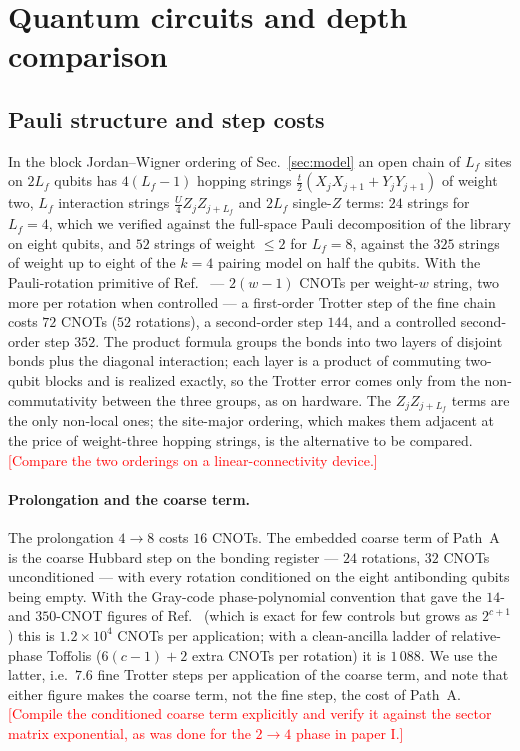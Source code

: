 \documentclass[
  aps,
  prc,
  reprint,
  superscriptaddress,
  floatfix,
  nofootinbib
]{revtex4-2}
\newcommand{\todo}[1]{\textcolor{red}{[#1]}}
\begin{document}
\section{Quantum circuits and depth comparison}
\label{sec:circuits}

\subsection{Pauli structure and step costs}
In the block Jordan--Wigner ordering of Sec.~\ref{sec:model} an open chain
of $L_f$ sites on $2L_f$ qubits has $4(L_f-1)$ hopping strings
$\tfrac t2(X_jX_{j+1}+Y_jY_{j+1})$ of weight two, $L_f$ interaction strings
$\tfrac U4Z_jZ_{j+L_f}$ and $2L_f$ single-$Z$ terms: $24$ strings for
$L_f=4$, which we verified against the full-space Pauli decomposition of the
library on eight qubits, and $52$ strings of weight $\le2$ for $L_f=8$,
against the $325$ strings of weight up to eight of the $k=4$ pairing model
on half the qubits.  With the Pauli-rotation primitive of
Ref.~\cite{EigenQPairing2026} --- $2(w-1)$ CNOTs per weight-$w$ string, two
more per rotation when controlled --- a first-order Trotter step of the fine
chain costs $72$ CNOTs ($52$ rotations), a second-order step $144$, and a
controlled second-order step $352$.  The product formula groups the bonds
into two layers of disjoint bonds plus the diagonal interaction; each layer
is a product of commuting two-qubit blocks and is realized exactly, so the
Trotter error comes only from the non-commutativity between the three
groups, as on hardware.  The $Z_jZ_{j+L_f}$ terms are the only non-local
ones; the site-major ordering, which makes them adjacent at the price of
weight-three hopping strings, is the alternative to be compared.
\todo{Compare the two orderings on a linear-connectivity device.}

\paragraph{Prolongation and the coarse term.}
The prolongation $4\to8$ costs $16$ CNOTs.  The embedded coarse term of
Path~A is the coarse Hubbard step on the bonding register --- $24$
rotations, $32$ CNOTs unconditioned --- with every rotation conditioned on
the eight antibonding qubits being empty.  With the Gray-code
phase-polynomial convention that gave the $14$- and $350$-CNOT figures of
Ref.~\cite{EigenQPairing2026} (which is exact for few controls but grows as
$2^{c+1}$) this is $1.2\times10^4$ CNOTs per application; with a
clean-ancilla ladder of relative-phase Toffolis ($6(c-1)+2$ extra CNOTs per
rotation) it is $1\,088$.  We use the latter, i.e.\ $7.6$ fine Trotter steps
per application of the coarse term, and note that either figure makes the
coarse term, not the fine step, the cost of Path~A.  \todo{Compile the
conditioned coarse term explicitly and verify it against the sector matrix
exponential, as was done for the $2\to4$ phase in paper I.}
\end{document}
